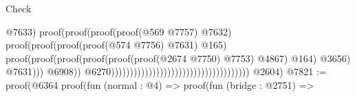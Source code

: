\begin{lexlean}{Check}
\begin{coremodule}
                                                                                                                            @7633)
                                                                                                                          proof(proof(proof(proof(@569
                                                                                                                                    @7757)
                                                                                                                                  @7632)
                                                                                                                                proof(proof(proof(proof(@574
                                                                                                                                          @7756)
                                                                                                                                        @7631)
                                                                                                                                      @165)
                                                                                                                                    proof(proof(proof(proof(proof(proof(@2674
                                                                                                                                                  @7750)
                                                                                                                                                @7753)
                                                                                                                                              @4867)
                                                                                                                                            @164)
                                                                                                                                          @3656)
                                                                                                                                        @7631)))
                                                                                                                              @6908))
                                                                                                                        @6270)))))))))))))))))))))))))))))))))))))
      @2604)
@7821 := proof(@6364
      proof(fun (normal : @4) =>
        proof(fun (bridge : @2751) =>

\end{coremodule}
\end{lexlean}

